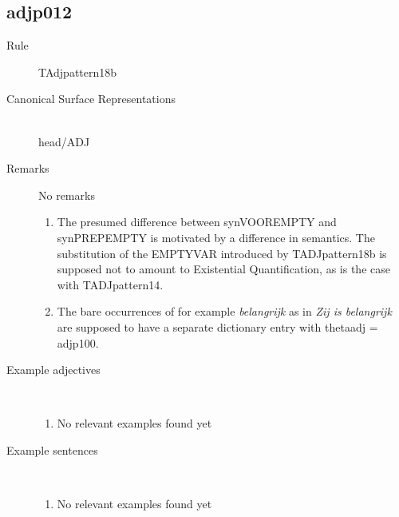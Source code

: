   \subsection{adjp012}
\begin{description}
  \item [Rule] TAdjpattern18b
  \item [Canonical Surface Representations]\mbox{}\\  head/ADJ
  \item [Remarks]  No remarks
\begin{enumerate}
  \item
The presumed 
difference between synVOOREMPTY and synPREPEMPTY is
motivated by a difference in semantics.  The substitution of the EMPTYVAR 
introduced by TADJpattern18b is supposed not to 
amount to Existential Quantification, as 
is the case with TADJpattern14.
  \item  The bare occurrences of for example 
{\em belangrijk} as in {\em Zij is belangrijk} 
are supposed to have a separate dictionary entry with thetaadj = adjp100.
\end{enumerate}
  \item [Example adjectives]\mbox{}\\
\begin{enumerate}
  \item No relevant examples found yet
\end{enumerate}
  \item [Example sentences]\mbox{}\\
\begin{enumerate}
  \item No relevant examples found yet
\end{enumerate}
\end{description}



